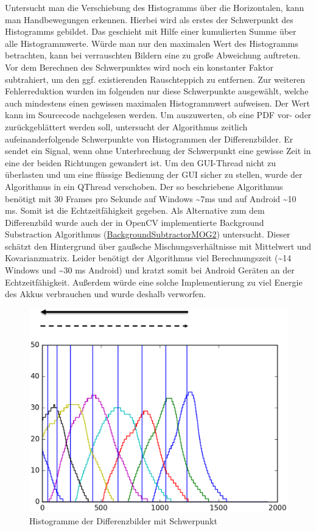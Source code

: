 Untersucht man die Verschiebung des Histogramms über die Horizontalen, kann man Handbewegungen erkennen. Hierbei wird als erstes der Schwerpunkt des Histogramms gebildet. Das geschieht mit Hilfe einer kumulierten Summe über alle Histogrammwerte. Würde man nur den maximalen Wert des Histogramms betrachten, kann bei verrauschten Bildern eine zu große Abweichung auftreten. Vor dem Berechnen des Schwerpunktes wird noch ein konstanter Faktor subtrahiert, um den ggf. existierenden Rauschteppich zu entfernen. Zur weiteren Fehlerreduktion wurden im folgenden nur diese Schwerpunkte ausgewählt, welche auch mindestens einen gewissen maximalen Histogrammwert aufweisen. Der Wert kann im Sourcecode nachgelesen werden. Um auszuwerten, ob eine PDF vor- oder zurückgeblättert werden soll, untersucht der Algorithmus zeitlich aufeinanderfolgende Schwerpunkte von Histogrammen der Differenzbilder. Er sendet ein Signal, wenn ohne Unterbrechung der Schwerpunkt eine gewisse Zeit in eine der beiden Richtungen gewandert ist. Um den GUI-Thread nicht zu überlasten und um eine flüssige Bedienung der GUI sicher zu stellen, wurde der Algorithmus in ein QThread verschoben. Der so beschriebene Algorithmus benötigt mit 30 Frames pro Sekunde auf Windows \textasciitilde 7ms und auf Android \textasciitilde 10 ms. Somit ist die Echtzeitfähigkeit gegeben. Als Alternative zum dem Differenzbild wurde auch der in OpenCV implementierte Background Substraction Algorithmus (\href{http://docs.opencv.org/3.0-rc1/d7/d7b/classcv_1_1BackgroundSubtractorMOG2.html}{BackgroundSubtractorMOG2}) untersucht. Dieser schätzt den Hintergrund über gaußsche Mischungsverhältnisse mit Mittelwert und Kovarianzmatrix. Leider benötigt der Algorithmus viel Berechnungszeit (\textasciitilde 14 Windows und \textasciitilde 30 ms Android) und kratzt somit bei Android Geräten an der Echtzeitfähigkeit. Außerdem würde eine solche Implementierung zu viel Energie des Akkus verbrauchen und wurde deshalb verworfen.

\begin{figure}[ht!]
\centering
\includegraphics[angle=0,width=14cm]{handcontrol/Bilder/histogramm_schwerpunkt.png}
\caption{Histogramme der Differenzbilder mit Schwerpunkt}
\end{figure}

